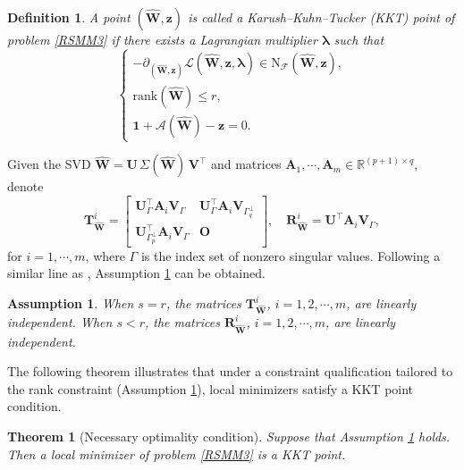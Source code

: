 \documentclass[sn-mathphys]{JORSC-jnl}%
\theoremstyle{thmstyleone}%
\newtheorem{theorem}{Theorem}%
\theoremstyle{thmstylethree}%
\newtheorem{definition}{Definition}%
\theoremstyle{thmstyleone} %
\newtheorem{assumption}{Assumption}
\begin{document}
\begin{definition}\label{stat}
	A point $(\hat{\mathbf{W}},\mathbf{z})$ is called a Karush–Kuhn–Tucker (KKT) point of problem \eqref{RSMM3} if there exists a Lagrangian multiplier $\bm{\lambda}$ such that
	\begin{equation*}
		\begin{cases}
			-\partial_{(\hat{\mathbf{W}},\mathbf{z})}\mathscr{L}(\hat{\mathbf{W}},\mathbf{z},\bm{\lambda})
			\in \mathrm{N}_{\mathcal{F}}(\hat{\mathbf{W}},\mathbf{z}),\\[4pt]
			\mathrm{rank}(\hat{\mathbf{W}}) \leq r,\\[4pt]
			\mathbf{1}+\mathscr{A}(\hat{\mathbf{W}})-\mathbf{z}=0.
		\end{cases}
	\end{equation*}
\end{definition}

Given the SVD  $
\hat{\mathbf{W}}=\mathbf{U}\,\Sigma(\hat{\mathbf{W}})\,\mathbf{V}^\top$ and
matrices $\mathbf{A}_1,\cdots,\mathbf{A}_{m}\in\mathbb{R}^{(p+1)\times q}$, denote
\begin{equation*}\label{Ti}
	\mathbf{T}^i_{\hat{\mathbf{W}}} =
	\left[
	\begin{array}{cc}
		\mathbf{U}_{\Gamma}^\top \mathbf{A}_i \mathbf{V}_{\Gamma}
		& \mathbf{U}_{\Gamma}^\top \mathbf{A}_i \mathbf{V}_{\Gamma_q^\perp} \\[4pt]
		\mathbf{U}_{\Gamma_p^\perp}^\top \mathbf{A}_i \mathbf{V}_{\Gamma}
		& \mathbf{O}
	\end{array}
	\right],
	\quad
	\mathbf{R}^i_{\hat{\mathbf{W}}} = \mathbf{U}^\top \mathbf{A}_i \mathbf{V}_{\Gamma},
\end{equation*}
for $i=1,\cdots,m$, where $\Gamma$ is the index set of nonzero singular values.
Following a similar line as \cite{li2023normal}, Assumption \ref{ass1} can be obtained.

\begin{assumption}\label{ass1}
When $s=r$, the matrices $\mathbf{T}_{\hat{\mathbf{W}}}^i$, $i=1,2,\cdots,m$, are linearly independent. When $s<r$, the matrices $\mathbf{R}_{\hat{\mathbf{W}}}^i$, $i=1,2,\cdots,m$, are linearly independent.
\end{assumption}

The following theorem illustrates that under a constraint qualification tailored to the rank constraint (Assumption \ref{ass1}), local minimizers satisfy a KKT point condition.



\begin{theorem}[Necessary optimality condition] Suppose that Assumption \ref{ass1} holds. Then a local minimizer of problem \eqref{RSMM3} is a KKT point.
\end{theorem}
\end{document}

